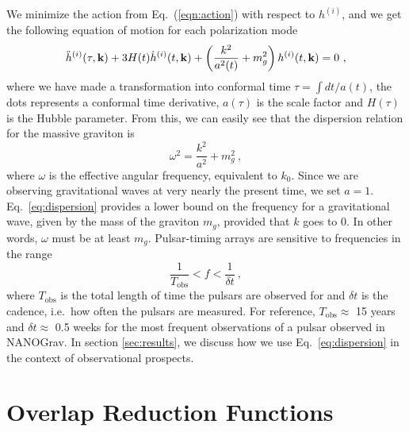\documentclass[prd,aps,psfig,nofootinbib,nobibnotes,superscriptaddress,preprintnumbers,times]{revtex4-2}\setlength{\topmargin}{-14mm}
\begin{document}
We minimize the action from Eq.\ (\ref{eqn:action}) with respect to $h^{(i)}$, and we get the following equation of motion for each polarization mode \cite{Maggiore:v2} 
\begin{equation}\label{eqn:eom}
    \ddot{h}^{(i)}(\tau, {\bf k}) + 3 H(t)\dot{h}^{(i)}(t, {\bf k}) + \left(\frac{k^2}{a^2(t)} + m_g^2\right)h^{(i)}(t, {\bf k}) = 0 \ ,
\end{equation}
where we have made a transformation into conformal time $\tau = \int  dt / a(t)$, the dots represents a conformal time derivative, $a(\tau)$ is the scale factor and $H(\tau)$ is the Hubble parameter. From this, we can easily see that the dispersion relation for the massive graviton is 
\begin{equation}\label{eq:dispersion}
    \omega^2 = \frac{k^2}{a^2} + m_g^2 \ ,
\end{equation}
where $\omega$ is the effective angular frequency, equivalent to $k_0$. Since we are observing gravitational waves at very nearly the present time, we set $a = 1$. Eq.\ \ref{eq:dispersion} provides a lower bound on the frequency for a gravitational wave, given by the mass of the graviton $m_g$, provided that $k$ goes to 0. In other words, $\omega$ must be at least $m_g$. Pulsar-timing arrays are sensitive to frequencies in the range \cite{Moore:2014lga}
\begin{equation}\label{eq:freqrange}
    \frac{1}{T_{\text{obs}}} < f < \frac{1}{\delta t} \ ,
\end{equation} where $T_{\text{obs}}$ is the total length of time the pulsars are observed for and $\delta t$ is the cadence, i.e.\ how often the pulsars are measured. For reference, $T_{\text{obs}} \approx$ 15 years and $\delta t \approx$ 0.5 weeks for the most frequent observations of a pulsar observed in NANOGrav. In section \ref{sec:results}, we discuss how we use Eq.\ \ref{eq:dispersion} in the context of observational prospects. 

\section{Overlap Reduction Functions}\label{sec:overlap}
\end{document}

